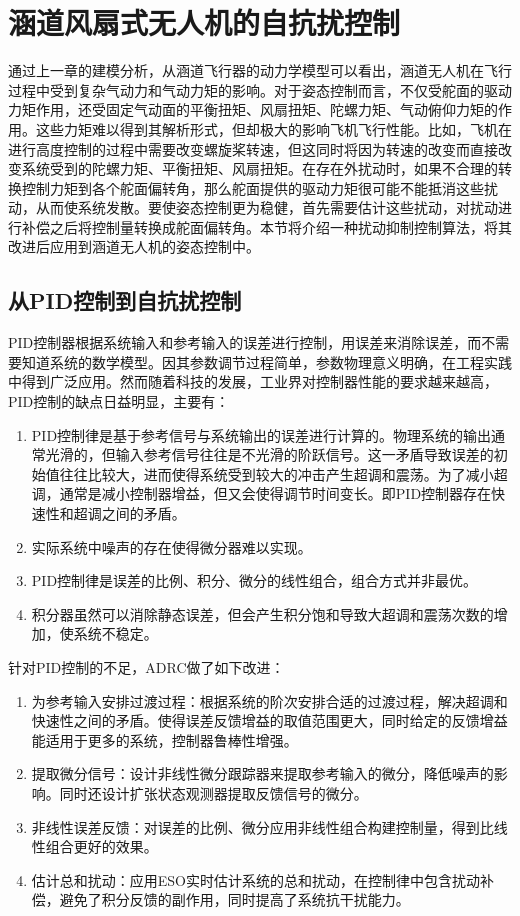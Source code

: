 \chapter{涵道风扇式无人机的自抗扰控制}
%
通过上一章的建模分析，从涵道飞行器的动力学模型可以看出，涵道无人机在飞行过程中受到复杂气动力和气动力矩的影响。对于姿态控制而言，不仅受舵面的驱动力矩作用，还受固定气动面的平衡扭矩、风扇扭矩、陀螺力矩、气动俯仰力矩的作用。这些力矩难以得到其解析形式，但却极大的影响飞机飞行性能。比如，飞机在进行高度控制的过程中需要改变螺旋桨转速，但这同时将因为转速的改变而直接改变系统受到的陀螺力矩、平衡扭矩、风扇扭矩。在存在外扰动时，如果不合理的转换控制力矩到各个舵面偏转角，那么舵面提供的驱动力矩很可能不能抵消这些扰动，从而使系统发散。要使姿态控制更为稳健，首先需要估计这些扰动，对扰动进行补偿之后将控制量转换成舵面偏转角。本节将介绍一种扰动抑制控制算法，将其改进后应用到涵道无人机的姿态控制中。
\section{从PID控制到自抗扰控制}
PID控制器根据系统输入和参考输入的误差进行控制，用误差来消除误差，而不需要知道系统的数学模型。因其参数调节过程简单，参数物理意义明确，在工程实践中得到广泛应用。然而随着科技的发展，工业界对控制器性能的要求越来越高，PID控制的缺点日益明显，主要有：
\begin{enumerate}
	\item PID控制律是基于参考信号与系统输出的误差进行计算的。物理系统的输出通常光滑的，但输入参考信号往往是不光滑的阶跃信号。这一矛盾导致误差的初始值往往比较大，进而使得系统受到较大的冲击产生超调和震荡。为了减小超调，通常是减小控制器增益，但又会使得调节时间变长。即PID控制器存在快速性和超调之间的矛盾。
	\item 实际系统中噪声的存在使得微分器难以实现。
	\item PID控制律是误差的比例、积分、微分的线性组合，组合方式并非最优。
	\item 积分器虽然可以消除静态误差，但会产生积分饱和导致大超调和震荡次数的增加，使系统不稳定。 
\end{enumerate}

针对PID控制的不足，ADRC做了如下改进：
\begin{enumerate}
	\item 为参考输入安排过渡过程：根据系统的阶次安排合适的过渡过程，解决超调和快速性之间的矛盾。使得误差反馈增益的取值范围更大，同时给定的反馈增益能适用于更多的系统，控制器鲁棒性增强。
	\item 提取微分信号：设计非线性微分跟踪器来提取参考输入的微分，降低噪声的影响。同时还设计扩张状态观测器提取反馈信号的微分。
	\item 非线性误差反馈：对误差的比例、微分应用非线性组合构建控制量，得到比线性组合更好的效果。
	\item 估计总和扰动：应用ESO实时估计系统的总和扰动，在控制律中包含扰动补偿，避免了积分反馈的副作用，同时提高了系统抗干扰能力。
\end{enumerate}
